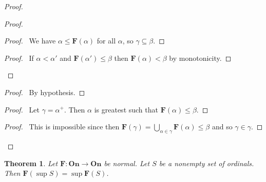 \documentclass{report}
\let\qed\relax
\newtheorem{theorem}[axiom]{Theorem}
\theoremstyle{definition}
\begin{document}
    \begin{proof}
        \pf
            \begin{proof}
                \begin{proof}
                    \pf\ We have $\alpha \leq \mathbf{F}(\alpha)$ for all $\alpha$, so $\gamma \subseteq \beta$.
                \end{proof}
                \begin{proof}
                    \pf\ If $\alpha < \alpha'$ and $\mathbf{F}(\alpha') \leq \beta$ then $\mathbf{F}(\alpha) < \beta$
                    by monotonicity.
                \end{proof}
            \end{proof}
            \begin{proof}
                \pf\ By hypothesis.
            \end{proof}
        \begin{proof}
            \pf\ Let $\gamma = \alpha^+$. Then $\alpha$ is greatest such that $\mathbf{F}(\alpha) \leq \beta$.
        \end{proof}
        \begin{proof}
            \pf\ This is impossible since then $\mathbf{F}(\gamma) = \bigcup_{\alpha \in \gamma} \mathbf{F}(\alpha) \leq \beta$
            and so $\gamma \in \gamma$.
        \end{proof}
        \qed
    \end{proof}

    \begin{theorem}
        \label{theorem:normal_sup}
        Let $\mathbf{F} : \mathbf{On} \rightarrow \mathbf{On}$ be normal. Let $S$ be a nonempty set of
        ordinals. Then $\mathbf{F}(\sup S) = \sup \mathbf{F}(S)$.
    \end{theorem}
\end{document}
